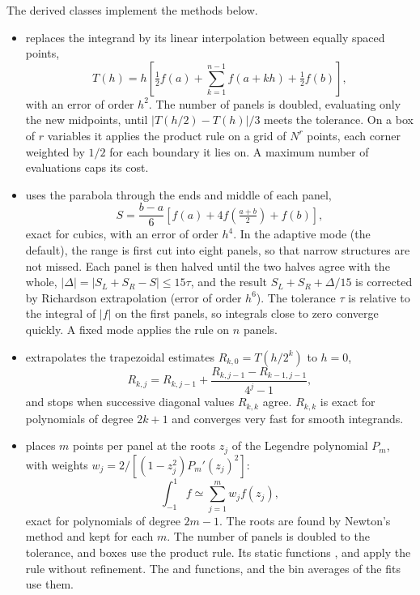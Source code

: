 The derived classes implement the methods below.
\begin{itemize}
\item {} replaces the integrand by its linear interpolation between equally spaced points,
\begin{equation}
T(h) = h\left[\tfrac12 f(a) + \sum_{k=1}^{n-1} f(a+kh) + \tfrac12 f(b)\right],
\end{equation}
with an error of order $h^2$. The number of panels is doubled, evaluating only the new midpoints, until
$|T(h/2)-T(h)|/3$ meets the tolerance. On a box of $r$ variables it applies the product rule on a grid of $N^r$
points, each corner weighted by $1/2$ for each boundary it lies on. A maximum number of evaluations caps its cost.

\item {} uses the parabola through the ends and middle of each panel,
\begin{equation}
S = \frac{b-a}{6}\left[f(a)+4f\!\left(\tfrac{a+b}{2}\right)+f(b)\right],
\end{equation}
exact for cubics, with an error of order $h^4$. In the adaptive mode (the default), the range is first cut into
eight panels, so that narrow structures are not missed. Each panel is then halved until the two halves agree with
the whole, $|\Delta| = |S_L+S_R-S| \le 15\tau$, and the result $S_L+S_R+\Delta/15$ is corrected by Richardson
extrapolation (error of order $h^6$). The tolerance $\tau$ is relative to the integral of $|f|$ on the first panels,
so integrals close to zero converge quickly. A fixed mode applies the rule on $n$ panels.

\item {} extrapolates the trapezoidal estimates $R_{k,0}=T(h/2^k)$ to $h=0$,
\begin{equation}
R_{k,j} = R_{k,j-1} + \frac{R_{k,j-1}-R_{k-1,j-1}}{4^j-1},
\end{equation}
and stops when successive diagonal values $R_{k,k}$ agree. $R_{k,k}$ is exact for polynomials of degree $2k+1$ and
converges very fast for smooth integrands.

\item {} places $m$ points per panel at the roots $z_j$ of the Legendre polynomial
$P_m$, with weights $w_j = 2/[(1-z_j^2)P_m'(z_j)^2]$:
\begin{equation}
\int_{-1}^{1} f \simeq \sum_{j=1}^m w_j f(z_j),
\end{equation}
exact for polynomials of degree $2m-1$. The roots are found by Newton's method and kept for each $m$. The number of
panels is doubled to the tolerance, and boxes use the product rule. Its static functions ,
 and  apply the rule without refinement. The  and
 functions,  and the bin averages of the fits use them.


\end{itemize}
